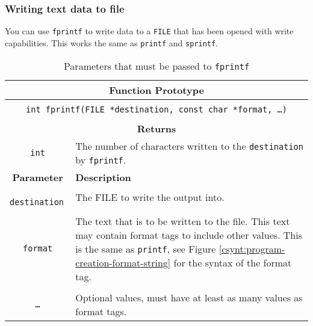 
\subsubsection{Writing text data to file} %
\label{ssub:writing_text_data_to_file}

You can use \texttt{fprintf} to write data to a \texttt{FILE} that has been opened with write capabilities. This works the same as \texttt{printf} and \texttt{sprintf}.

\begin{table}[h]
  \centering
  \begin{tabular}{|c|p{9cm}|}
    \hline
    \multicolumn{2}{|c|}{\textbf{Function Prototype}} \\
    \hline
    \multicolumn{2}{|c|}{} \\
    \multicolumn{2}{|c|}{\texttt{int fprintf(FILE *destination, const char *format, \ldots )}} \\
    \multicolumn{2}{|c|}{} \\
    \hline
    \multicolumn{2}{|c|}{\textbf{Returns}} \\
    \hline
    \texttt{int} & The number of characters written to the \texttt{destination} by \texttt{fprintf}. \\
    \hline
    \textbf{Parameter} & \textbf{Description} \\
    \hline
    \texttt{ destination } & The FILE to write the output into.\\
    & \\
    \texttt{ format } & The text that is to be written to the file. This text may contain format tags to include other values. This is the same as \texttt{printf}, see Figure \ref{csynt:program-creation-format-string} for the syntax of the format tag. \\
    & \\
    \texttt{\ldots}   & Optional values, must have at least as many values as format tags. \\
    \hline
  \end{tabular}
  \caption{Parameters that must be passed to \texttt{fprintf}}
  \label{tbl:fprintf}
\end{table}


